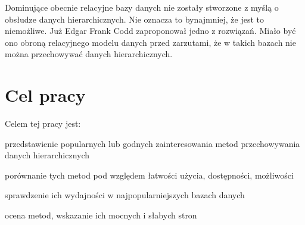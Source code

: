 Dominujące obecnie relacyjne bazy danych nie zostały stworzone z myślą o obsłudze danych hierarchicznych.
Nie oznacza to bynajmniej, że jest to niemożliwe.
Już Edgar Frank Codd zaproponował jedno z rozwiązań.
Miało być ono obroną relacyjnego modelu danych przed zarzutami,
że w takich bazach nie można przechowywać danych hierarchicznych.



\section{Cel pracy}






Celem tej pracy jest:
\begin{itemize*}
    \item przedstawienie popularnych lub godnych zainteresowania metod przechowywania danych hierarchicznych
    \item porównanie tych metod pod względem łatwości użycia, dostępności, możliwości
    \item sprawdzenie ich wydajności w najpopularniejszych bazach danych
    \item ocena metod, wskazanie ich mocnych i słabych stron
\end{itemize*}







